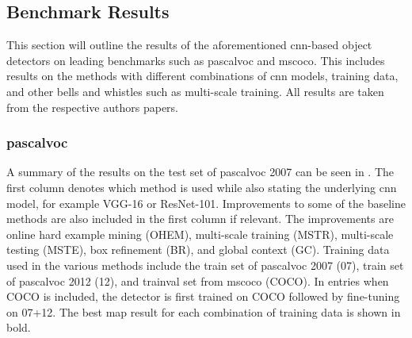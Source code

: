 \subsection{Benchmark Results}\label{sec:benchresults}

This section will outline the results of the aforementioned \gls{cnn}-based object detectors on leading benchmarks such as \gls{pascalvoc} and \gls{mscoco}. This includes results on the methods with different combinations of \gls{cnn} models, training data, and other bells and whistles such as multi-scale training. All results are taken from the respective authors papers.

\subsubsection{\gls{pascalvoc}}
A summary of the results on the test set of \gls{pascalvoc} 2007 can be seen in . The first column denotes which method is used while also stating the underlying \gls{cnn} model, for example VGG-16 or ResNet-101. Improvements to some of the baseline methods are also included in the first column if relevant. The improvements are online hard example mining (OHEM), multi-scale training (MSTR), multi-scale testing (MSTE), box refinement (BR), and global context (GC). Training data used in the various methods include the train set of \gls{pascalvoc} 2007 (07), train set of \gls{pascalvoc} 2012 (12), and trainval set from \gls{mscoco} (COCO). In entries when COCO is included, the detector is first trained on COCO followed by fine-tuning on 07+12. The best \gls{map} result for each combination of training data is shown in bold.


